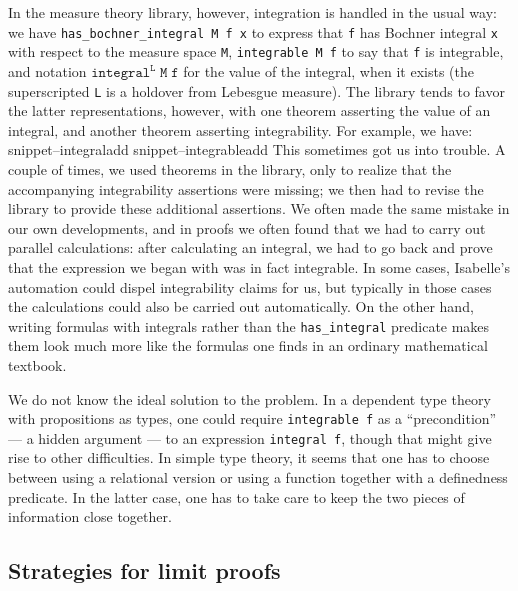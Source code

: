 \documentclass{svjour3}
\newcommand{\Snippet}[1]{\csname snippet--#1\endcsname}
\begin{document}
In the measure theory library, however, integration is handled in the usual way: we have \verb=has_bochner_integral M f x= to express that \texttt{f} has Bochner integral \texttt{x} with respect to the measure space \texttt{M}, \texttt{integrable M f} to say that \texttt{f} is integrable, and notation $\mathtt{integral^L \; M \; f}$ for the value of the integral, when it exists (the superscripted \texttt{L} is a holdover from Lebesgue measure). The library tends to favor the latter representations, however, with one theorem asserting the value of an integral, and another theorem asserting integrability. For example, we have:
\Snippet{integraladd}
\Snippet{integrableadd}
This sometimes got us into trouble. A couple of times, we used theorems in the library, only to realize that the accompanying integrability assertions were missing; we then had to revise the library to provide these additional assertions. We often made the same mistake in our own developments, and in proofs we often found that we had to carry out parallel calculations: after calculating an integral, we had to go back and prove that the expression we began with was in fact integrable. In some cases, Isabelle's automation could dispel integrability claims for us, but typically in those cases the calculations could also be carried out automatically. On the other hand, writing formulas with integrals rather than the \verb=has_integral= predicate makes them look much more like the formulas one finds in an ordinary mathematical textbook.

We do not know the ideal solution to the problem. In a dependent type theory with propositions as types, one could require \texttt{integrable f} as a ``precondition'' --- a hidden argument --- to an expression \texttt{integral f}, though that might give rise to other difficulties. In simple type theory, it seems that one has to choose between using a relational version or using a function together with a definedness predicate. In the latter case, one has to take care to keep the two pieces of information close together.


\subsection{Strategies for limit proofs}
\end{document}
